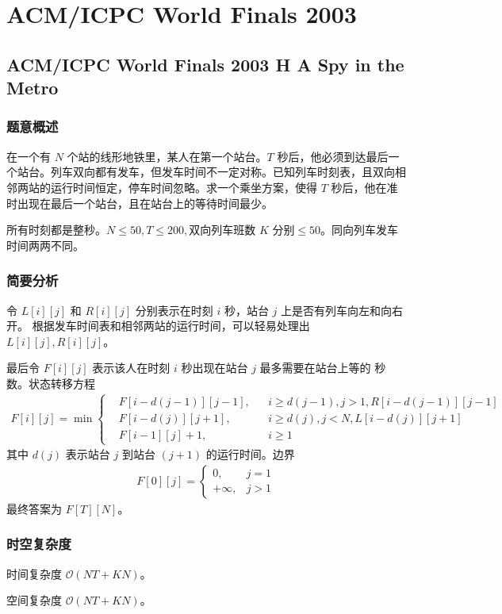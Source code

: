 	\section{ACM/ICPC World Finals 2003}
		\subsection{ACM/ICPC World Finals 2003 H A Spy in the Metro}
			\subsubsection{题意概述}
				在一个有 $N$ 个站的线形地铁里，某人在第一个站台。$T$ 秒后，他必须到达最后一个站台。列车双向都有发车，但发车时间不一定对称。已知列车时刻表，且双向相邻两站的运行时间恒定，停车时间忽略。求一个乘坐方案，使得 $T$ 秒后，他在准时出现在最后一个站台，且在站台上的等待时间最少。
				
				所有时刻都是整秒。$N \le 50, T \le 200, \text{双向列车班数 $K$ 分别} \le 50$。同向列车发车时间两两不同。
			\subsubsection{简要分析}
				令 $L[i][j]$ 和 $R[i][j]$ 分别表示在时刻 $i$ 秒，站台 $j$ 上是否有列车向左和向右开。
				根据发车时间表和相邻两站的运行时间，可以轻易处理出 $L[i][j], R[i][j]$。
				
				最后令 $F[i][j]$ 表示该人在时刻 $i$ 秒出现在站台 $j$ 最多需要在站台上等的
				秒数。状态转移方程
				\begin{align}
				F[i][j] = \min \left\{ \begin{aligned}
					& F[i-d(j-1)][j-1], && i\ge d(j-1), j>1, R[i-d(j-1)][j-1]\\
					& F[i-d(j)][j+1], && i\ge d(j), j<N, L[i-d(j)][j+1]\\
					& F[i-1][j]+1, && i \ge 1
					\end{aligned}
				\right.
				\end{align}
				其中 $d(j)$ 表示站台 $j$ 到站台 $(j+1)$ 的运行时间。边界
				\begin{align}
					F[0][j] = \begin{cases}
						0, & j=1\\
						+\infty, & j>1
					\end{cases}
				\end{align}
				最终答案为 $F[T][N]$。
				\subsubsection{时空复杂度}
					时间复杂度 $\mathcal{O}\left(NT + KN\right)$。
							
					空间复杂度 $\mathcal{O}\left(NT + KN\right)$。